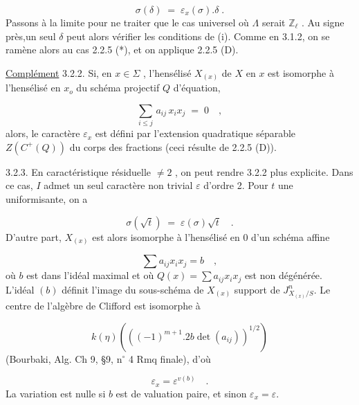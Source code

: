 \begin{equation*}
\sigma(\delta) \;=\; \varepsilon_{x}(\sigma).\delta \;.
\end{equation*}
Passons à la limite pour ne traiter que le cas universel où $\Lambda$ serait $\mathbb{Z}_{\ell}$ . Au signe près,un seul $\delta$ peut alors vérifier les conditions de (i). Comme en 3.1.2, on se ramène alors au cas 2.2.5 (*), et on applique 2.2.5 (D).

\underline{Complément} 3.2.2.  Si, en $x \in \Sigma$ , l'hensélisé $X_{(x)}$ de $X$ en $x$ est isomorphe à l'hensélisé en $x_{o}$ du schéma projectif $Q$ d'équation,

\begin{equation*}
\sum_{i \leq j}\, a_{ij}\, x_{i}x_{j} \;=\; 0 \quad ,
\end{equation*}
alors, le caractère $\varepsilon_{x}$ est défini par l'extension quadratique séparable $Z(C^{+}(Q))$ du corps des fractions (ceci résulte de 2.2.5 (D)).

3.2.3.  En caractéristique résiduelle $\neq 2$ , on peut rendre 3.2.2 plus explicite. Dans ce cas, $I$ admet un seul caractère non trivial $\varepsilon$ d'ordre 2. Pour $t$ une uniformisante, on a

\begin{equation*}
\sigma(\sqrt{t}) \;=\; \varepsilon(\sigma)\sqrt{t} \quad .
\end{equation*}
D'autre part, $X_{(x)}$ est alors isomorphe à l'hensélisé en $0$ d'un schéma affine 



\begin{equation*}
\sum a_{ij}x_i x_j = b \quad ,
\end{equation*}
où $b$ est dans l'idéal maximal et où $Q(x)=\sum a_{ij}x_i x_j$ est non dégénérée. L'idéal $(b)$ définit l'image du sous-schéma de $X_{(x)}$ support de $J^n_{X_{(x)}/S}$. Le centre de l'algèbre de Clifford est isomorphe à

\begin{equation*}
k(\eta)\left(\left((-1)^{m+1}.2b\det(a_{ij})\right)^{1/2}\right)
\end{equation*}
(Bourbaki, Alg. Ch 9, §9, n$^{\circ}$ 4 Rmq finale), d'où

\begin{equation*}
\varepsilon_x = \varepsilon^{v(b)} \quad .
\end{equation*}
La variation est nulle si $b$ est de valuation paire, et sinon $\varepsilon_x=\varepsilon$.


